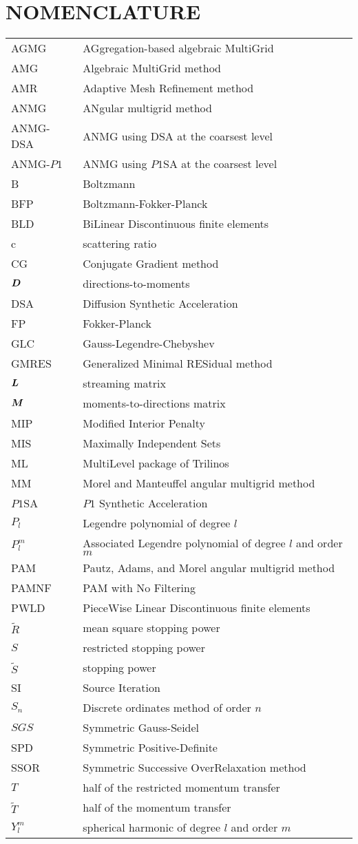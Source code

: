 \chapter*{NOMENCLATURE}

\begin{xtabular}{ll}
      AGMG & AGgregation-based algebraic MultiGrid \tabularnewline
       AMG & Algebraic MultiGrid method \tabularnewline
       AMR & Adaptive Mesh Refinement method \tabularnewline
      ANMG & ANgular multigrid method \tabularnewline
  ANMG-DSA & ANMG using DSA at the coarsest level \tabularnewline
 ANMG-$P1$ & ANMG using $P1$SA at the coarsest level \tabularnewline
         B & Boltzmann \tabularnewline
       BFP & Boltzmann-Fokker-Planck \tabularnewline
       BLD & BiLinear Discontinuous finite elements \tabularnewline
         c & scattering ratio \tabularnewline
        CG & Conjugate Gradient method \tabularnewline
  $\boldsymbol{D}$ & directions-to-moments \tabularnewline
       DSA & Diffusion Synthetic Acceleration \tabularnewline
        FP & Fokker-Planck \tabularnewline
       GLC & Gauss-Legendre-Chebyshev \tabularnewline
     GMRES & Generalized Minimal RESidual method \tabularnewline
  $\boldsymbol{L}$ & streaming matrix \tabularnewline
  $\boldsymbol{M}$ & moments-to-directions matrix \tabularnewline
       MIP & Modified Interior Penalty \tabularnewline
       MIS & Maximally Independent Sets \tabularnewline
        ML & MultiLevel package of Trilinos \tabularnewline
        MM & Morel and Manteuffel angular multigrid method \tabularnewline
    $P1$SA & $P1$ Synthetic Acceleration \tabularnewline
     $P_l$ & Legendre polynomial of degree $l$ \tabularnewline
   $P_l^m$ & Associated Legendre polynomial of degree $l$ and order $m$
  \tabularnewline
       PAM & Pautz, Adams, and Morel angular multigrid method \tabularnewline
     PAMNF & PAM with No Filtering \tabularnewline
      PWLD & PieceWise Linear Discontinuous finite elements \tabularnewline
  $\tilde{R}$ & mean square stopping power \tabularnewline
       $S$ & restricted stopping power \tabularnewline
  $\tilde{S}$ & stopping power \tabularnewline
        SI & Source Iteration \tabularnewline
     $S_n$ & Discrete ordinates method of order $n$ \tabularnewline
     $SGS$ & Symmetric Gauss-Seidel \tabularnewline
       SPD & Symmetric Positive-Definite \tabularnewline
      SSOR & Symmetric Successive OverRelaxation method \tabularnewline
       $T$ & half of the restricted momentum transfer \tabularnewline
$\tilde{T}$ & half of the momentum transfer \tabularnewline
   $Y_l^m$ & spherical harmonic of degree $l$ and order $m$ \tabularnewline 

\end{xtabular}

